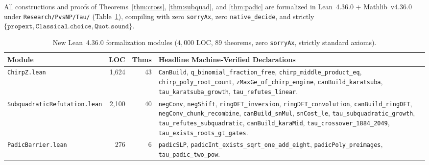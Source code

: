 \documentclass[11pt]{article}
\newcommand{\code}[1]{\texttt{#1}}
\begin{document}
All constructions and proofs of Theorems~\ref{thm:cross}, \ref{thm:subquad}, and \ref{thm:padic} are formalized in Lean~4.36.0 + Mathlib~v4.36.0 under \code{Research/PvsNP/Tau/} (Table~\ref{tab:lean_new}), compiling with zero \code{sorryAx}, zero \code{native\_decide}, and strictly $\{\code{propext}, \code{Classical.choice}, \code{Quot.sound}\}$.

\begin{table}[ht]
\centering
\small
\caption{New Lean~4.36.0 formalization modules ($4{,}000$ LOC, $89$ theorems, zero \code{sorryAx}, strictly standard axioms).}
\label{tab:lean_new}
\begin{tabularx}{\textwidth}{@{}l r r X@{}}
\toprule
Module & LOC & Thms & Headline Machine-Verified Declarations \\
\midrule
\code{ChirpZ.lean} & 1,624 & 43 & \code{CanBuild}, \code{q\_binomial\_fraction\_free}, \code{chirp\_middle\_product\_eq}, \code{chirp\_poly\_root\_count}, \code{zMaxGe\_of\_chirp\_engine}, \code{canBuild\_karatsuba}, \code{tau\_karatsuba\_growth}, \code{tau\_refutes\_linear}. \\
\addlinespace[3pt]
\code{SubquadraticRefutation.lean} & 2,100 & 40 & \code{negConv}, \code{negShift}, \code{ringDFT\_inversion}, \code{ringDFT\_convolution}, \code{canBuild\_ringDFT}, \code{negConv\_chunk\_recombine}, \code{canBuild\_snMul}, \code{snCost\_le}, \code{tau\_subquadratic\_growth}, \code{tau\_refutes\_subquadratic}, \code{canBuild\_karaMid}, \code{tau\_crossover\_1884\_2049}, \code{tau\_exists\_roots\_gt\_gates}. \\
\addlinespace[3pt]
\code{PadicBarrier.lean} & 276 & 6 & \code{padicSLP}, \code{padicInt\_exists\_sqrt\_one\_add\_eight}, \code{padicPoly\_preimages}, \code{tau\_padic\_two\_pow}. \\
\bottomrule
\end{tabularx}
\end{table}
\end{document}
